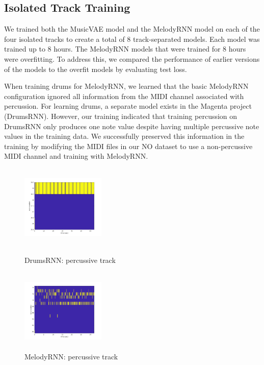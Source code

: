\documentclass{article}
\begin{document}
\subsection{Isolated Track Training}
We trained both the MusicVAE model and the MelodyRNN model on each of the four isolated tracks to create a total of 8 track-separated models. Each model was trained up to 8 hours. The MelodyRNN models that were trained for 8 hours were overfitting. To address this, we compared the performance of earlier versions of the models to the overfit models by evaluating test loss.

When training drums for MelodyRNN, we learned that the basic MelodyRNN configuration ignored all information from the MIDI channel associated with percussion. For learning drums, a separate model exists in the Magenta project (DrumsRNN). However, our training indicated that training percussion on DrumsRNN only produces one note value despite having multiple percussive note values in the training data. We successfully preserved this information in the training by modifying the MIDI files in our NO dataset to use a non-percussive MIDI channel and training with MelodyRNN.


\begin{figure}[htb!]
  \begin{minipage}{0.48\textwidth}
    \centering
    \includegraphics[height=4cm, width=4cm]{img/DrumRNN_drum.jpg}
    \caption{DrumsRNN: percussive track}
  \end{minipage}\hfill
  \begin{minipage}{0.48\textwidth}
    \centering
    \includegraphics[height=4cm, width=4cm]{img/MelodyRNN_drum.jpg}
    \caption{MelodyRNN: percussive track}
  \end{minipage}
\end{figure}
\end{document}
